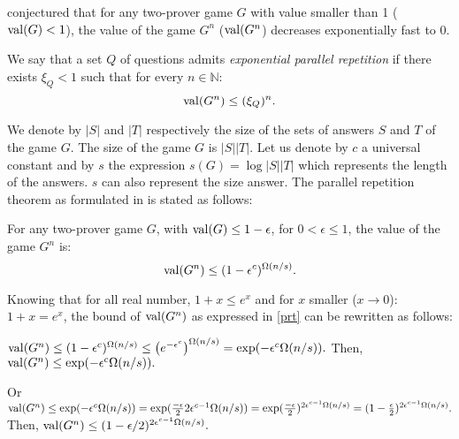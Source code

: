 \cite{feige1992two} conjectured that  for any two-prover game $G$ with value smaller than 1 ($\mathrm{val} (G)<1$), the value of the game $G^n$ ($\mathrm{val} (G^n$) decreases exponentially fast to 0.

We say that a set $Q$ of questions admits
\textit{exponential parallel repetition} if there exists $\xi_Q < 1$ such that for every $n \in \mathbb{N}$: $$\mathrm{val} (G^n) \leq (\xi_Q)^n.$$

We denote by $|S|$ and $|T|$ respectively the size of the sets of answers $S$ and $T$ of the game $G$. The size of the game $G$ is $|S||T|$.
Let us denote by $c$ a universal constant and by $s$ the expression  $s(G)=\log |S||T|$ which represents the length of the answers. $s$ can also represent the size answer.
The parallel repetition theorem as formulated in \cite{raz1998parallel,raz2010parallel} is stated as follows:

\begin{thm} For any two-prover game $G$, with $\mathrm{val} (G) \leq 1-\epsilon$, for $0 < \epsilon \leq 1$, the value of the game $G^n$ is: $$ \mathrm{val} (G^n) \leq (1-\epsilon^c)^{\Omega(n/s)}.$$ \label{prt}    \end{thm}

Knowing that for all real number, $1+x \leq e^x$ and
for $x$ smaller ($x\longrightarrow 0$): $1+x=e^x$,
the bound of $\mathrm{val} (G^n)$ as expressed in \eqref{prt} can be rewritten as follows:

$\mathrm{val} (G^n) \leq (1-\epsilon^c)^{\Omega(n/s)} \le \left(e^{-\epsilon^c}\right)^{\Omega(n/s)}= \exp (-\epsilon^c \Omega(n/s)).$ Then, $\mathrm{val} (G^n) \leq \exp (-\epsilon^c \Omega(n/s)).$

Or $\mathrm{val} (G^n) \leq \exp (-\epsilon^c \Omega(n/s))= \exp (\frac{-\epsilon}{2}2\epsilon^{c-1} \Omega(n/s))= \exp (\frac{-\epsilon}{2})^{2\epsilon^{c-1} \Omega(n/s)}= (1-\frac{\epsilon}{2})^{2\epsilon^{c-1} \Omega(n/s)}.$ Then, $\mathrm{val} (G^n) \leq (1-{\epsilon}/{2})^{2\epsilon^{c-1} \Omega(n/s)}.$

